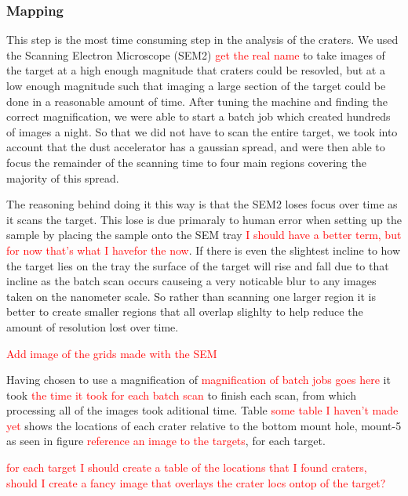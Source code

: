 \documentclass[review]{elsarticle}
\begin{document}
			\subsubsection{Mapping}
			This step is the most time consuming step in the analysis of the craters. We used the Scanning Electron Microscope (SEM2) \textcolor{red}{get the real name} to take images
			of the target at a high enough magnitude that craters could be resovled, but at a low enough magnitude such that imaging a large section of the target could be done 
			in a reasonable amount of time. After tuning the machine and finding the correct magnification, we were able to start a batch job which created hundreds of 
			images a night. So that we did not have to scan the entire target, we took into account that the dust accelerator has a gaussian spread, and were then able to 
			focus the remainder of the scanning time to four main regions covering the majority of this spread. 
			
			The reasoning behind doing it this way is that the SEM2 loses focus over time as it scans the target. This lose is due primaraly to human error when setting up the sample 
			by placing the sample onto the SEM tray \textcolor{red}{I should have a better term, but for now that's what I havefor the now}. If there is even the slightest incline to how the 
			target lies on the tray the surface of the target will rise and fall due to that incline as the batch scan occurs causeing a very noticable blur to any images 
			taken on the nanometer scale. So rather than scanning one larger region it is better to create smaller regions that all overlap slighlty to help reduce the amount of 
			resolution lost over time. 

			\textcolor{red}{Add image of the grids made with the SEM} 

			Having chosen to use a magnification of \textcolor{red}{magnification of batch jobs goes here} it took \textcolor{red}{the time it took for each batch scan} to 
			finish each scan, from which processing all of the images took aditional time. Table \textcolor{red}{some table I haven't made yet} shows the locations of each crater
			relative to the bottom mount hole, mount-5 as seen in figure \textcolor{red}{reference an image to the targets}, for each target.  


			\textcolor{red}{for each target I should create a table of the locations that I found craters, should I create a fancy image that overlays the crater locs ontop of the target?}
\end{document}
